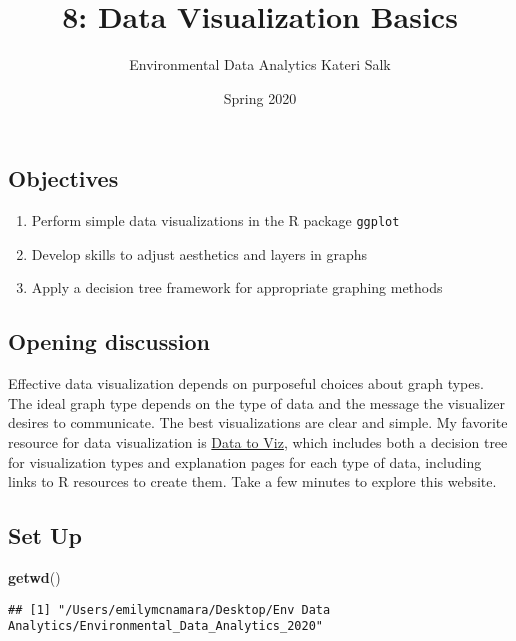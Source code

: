 \documentclass[]{article}
\title{8: Data Visualization Basics}
\author{Environmental Data Analytics \textbar{} Kateri Salk}
\date{Spring 2020}
\newenvironment{Shaded}{\begin{snugshade}}{\end{snugshade}}
\newcommand{\KeywordTok}[1]{\textcolor[rgb]{0.13,0.29,0.53}{\textbf{#1}}}
\newcommand{\NormalTok}[1]{#1}
\providecommand{\tightlist}{%
  \setlength{\itemsep}{0pt}\setlength{\parskip}{0pt}}
\begin{document}
\maketitle

\subsection{Objectives}\label{objectives}

\begin{enumerate}
\def\labelenumi{\arabic{enumi}.}
\tightlist
\item
  Perform simple data visualizations in the R package \texttt{ggplot}
\item
  Develop skills to adjust aesthetics and layers in graphs
\item
  Apply a decision tree framework for appropriate graphing methods
\end{enumerate}

\subsection{Opening discussion}\label{opening-discussion}

Effective data visualization depends on purposeful choices about graph
types. The ideal graph type depends on the type of data and the message
the visualizer desires to communicate. The best visualizations are clear
and simple. My favorite resource for data visualization is
\href{https://www.data-to-viz.com/}{Data to Viz}, which includes both a
decision tree for visualization types and explanation pages for each
type of data, including links to R resources to create them. Take a few
minutes to explore this website.

\subsection{Set Up}\label{set-up}

\begin{Shaded}
\begin{Highlighting}[]
\KeywordTok{getwd}\NormalTok{()}
\end{Highlighting}
\end{Shaded}

\begin{verbatim}
## [1] "/Users/emilymcnamara/Desktop/Env Data Analytics/Environmental_Data_Analytics_2020"
\end{verbatim}
\end{document}
